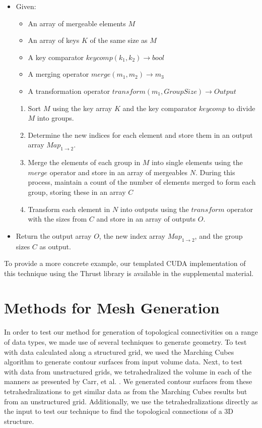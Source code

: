 \documentclass[journal]{vgtc}                %
\begin{document}
\begin{itemize}
	\item{Given:}
	\begin{itemize}
		\item{An array of mergeable elements $M$}
		\item{An array of keys $K$ of the same size as $M$}
		\item{A key comparator $keycomp(k_1, k_2) \rightarrow bool$}
		\item{A merging operator $merge(m_1, m_2) \rightarrow m_3$}
		\item{A transformation operator $transform(m_1, GroupSize) \rightarrow Output$}
	\end{itemize}
	\begin{enumerate}
		\item{Sort $M$ using the key array $K$ and the key comparator $keycomp$ to divide $M$ into groups.}
		\item{Determine the new indices for each element and store them in an output array $Map_{1\rightarrow 2}$.}
		\item{Merge the elements of each group in $M$ into single elements using the $merge$ operator and store in an array of mergeables $N$. During this process, maintain a count of the number of elements merged to form each group, storing these in an array $C$}
		\item{Transform each element in $N$ into outputs using the $transform$ operator with the sizes from $C$ and store in an array of outputs $O$.}		
	\end{enumerate}
	\item{Return the output array $O$, the new index array $Map_{1\rightarrow 2}$, and the group sizes $C$ as output.}
\end{itemize}

To provide a more concrete example, our templated CUDA implementation of this technique using the Thrust library is available in the supplemental material.

\section{Methods for Mesh Generation}
In order to test our method for generation of topological connectivities on a range of data types, we made use of several techniques to generate geometry.
To test with data calculated along a structured grid, we used the Marching Cubes algorithm to generate contour surfaces from input volume data. Next, to test
with data from unstructured grids, we tetrahedralized the volume in each of the manners as presented by Carr, et al. \cite{Carr2006}. We generated contour surfaces from these tetrahedralizations
to get similar data as from the Marching Cubes results but from an unstructured grid. Additionally, we use the tetrahedralizations directly as the input to test our technique
to find the topological connections of a 3D structure.
\end{document}
